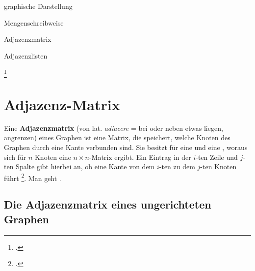 \documentclass{lehramt-informatik-haupt}
\begin{document}
\begin{compactitem}
\item graphische Darstellung
\item Mengenschreibweise
\item Adjazenzmatrix
\item Adjazenzlisten
\end{compactitem}
\footcite[Seite 4]{aud:fs:6}


%

\section{Adjazenz-Matrix}

Eine \textbf{Adjazenzmatrix} (von lat. \emph{adiacere} = bei oder neben
etwas liegen, angrenzen) eines Graphen ist eine Matrix, die speichert,
welche Knoten des Graphen durch eine Kante verbunden sind. Sie besitzt
für  eine  und eine ,
woraus sich für $n$ Knoten eine $n \times n$-Matrix ergibt. Ein Eintrag
in der $i$-ten Zeile und $j$-ten Spalte gibt hierbei an, ob eine Kante
von dem $i$-ten zu dem $j$-ten Knoten führt
\footcite{wiki:adjazenzmatrix}. Man geht .

%

\subsection{Die Adjazenzmatrix eines ungerichteten Graphen}
\end{document}
